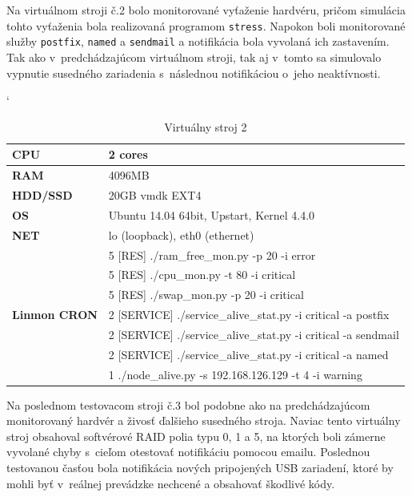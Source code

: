\newpage
Na virtuálnom stroji č.2 bolo monitorované vyťaženie hardvéru, pričom simulácia tohto vyťaženia bola realizovaná programom \texttt{stress}. Napokon boli monitorované služby \texttt{postfix}, \texttt{named} a \texttt{sendmail} a notifikácia bola vyvolaná ich zastavením. Tak ako v~predchádzajúcom virtuálnom stroji, tak aj v~tomto sa simulovalo vypnutie susedného zariadenia s~následnou notifikáciou o~jeho neaktívnosti.
\begin{table}[H]
	\catcode`
	\begin{center}
		\begin{tabular}{|l|l|}
			\hline
			\textbf{CPU} & 2 cores \\
			\hline
			\textbf{RAM} & 4096MB  \\
			\hline
			\textbf{HDD/SSD} & 20GB vmdk EXT4 \\
			\hline
			\textbf{OS} & Ubuntu 14.04 64bit, Upstart, Kernel 4.4.0 \\
			\hline
			\textbf{NET}& lo (loopback), eth0 (ethernet)\\
			\hline
			\multirow{7}{*}{\textbf{Linmon CRON}}  & 5 [RES] ./ram\_free\_mon.py -p 20 -i error\\
			& 5 [RES] ./cpu\_mon.py -t 80 -i critical\\
			& 5 [RES] ./swap\_mon.py -p 20 -i critical\\
			& 2 [SERVICE] ./service\_alive\_stat.py -i critical -a postfix\\
			& 2 [SERVICE] ./service\_alive\_stat.py -i critical -a sendmail\\
			& 2 [SERVICE] ./service\_alive\_stat.py -i critical -a named\\
			& 1 ./node\_alive.py -s 192.168.126.129 -t 4 -i warning\\
			\hline			
		\end{tabular}
		\caption{Virtuálny stroj 2}
		\label{virt_dev2}
	\end{center}
\end{table}

Na poslednom testovacom stroji č.3 bol podobne ako na predchádzajúcom monitorovaný hardvér a živosť ďalšieho susedného stroja. Naviac tento virtuálny stroj obsahoval softvérové RAID polia typu 0, 1 a 5, na ktorých boli zámerne vyvolané chyby s~cieľom otestovať notifikáciu pomocou emailu. Poslednou testovanou časťou bola notifikácia nových pripojených USB zariadení, ktoré by mohli byť v~reálnej prevádzke nechcené a obsahovať škodlivé kódy.

